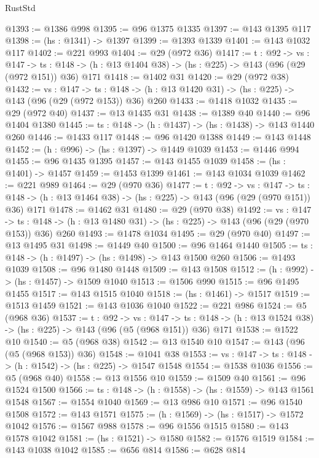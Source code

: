 \begin{lexlean}{RustStd}
\begin{coremodule}
{\begin{coremodule}
{{{{{@1393 := @1386 @998
@1395 := @96 @1375 @1335
@1397 := @143 @1395 @117
@1398 := (hs : @1341) -> @1397
@1399 := @1393 @1339
@1401 := @143 @1032 @117
@1402 := @221 @993
@1404 := @29 (@972 @36)
@1417 := {t : @92} ->
  {vs : @147} ->
  {ts : @148} -> (h : @13 @1404 @38) -> (hs : @225) -> @143 (@96 (@29 (@972 @151)) @36) @171
@1418 := @1402 @31
@1420 := @29 (@972 @38)
@1432 := {vs : @147} ->
  {ts : @148} -> (h : @13 @1420 @31) -> (hs : @225) -> @143 (@96 (@29 (@972 @153)) @36) @260
@1433 := @1418 @1032
@1435 := @29 (@972 @40)
@1437 := @13 @1435 @31
@1438 := @1389 @40
@1440 := @96 @1404 @1380
@1445 := {ts : @148} -> (h : @1437) -> (hs : @1438) -> @143 @1440 @260
@1446 := @1433 @117
@1448 := @96 @1420 @1388
@1449 := @143 @1448
@1452 := (h : @996) -> (hs : @1397) -> @1449 @1039
@1453 := @1446 @994
@1455 := @96 @1435 @1395
@1457 := @143 @1455 @1039
@1458 := (hs : @1401) -> @1457
@1459 := @1453 @1399
@1461 := @143 @1034 @1039
@1462 := @221 @989
@1464 := @29 (@970 @36)
@1477 := {t : @92} ->
  {vs : @147} ->
  {ts : @148} -> (h : @13 @1464 @38) -> (hs : @225) -> @143 (@96 (@29 (@970 @151)) @36) @171
@1478 := @1462 @31
@1480 := @29 (@970 @38)
@1492 := {vs : @147} ->
  {ts : @148} -> (h : @13 @1480 @31) -> (hs : @225) -> @143 (@96 (@29 (@970 @153)) @36) @260
@1493 := @1478 @1034
@1495 := @29 (@970 @40)
@1497 := @13 @1495 @31
@1498 := @1449 @40
@1500 := @96 @1464 @1440
@1505 := {ts : @148} -> (h : @1497) -> (hs : @1498) -> @143 @1500 @260
@1506 := @1493 @1039
@1508 := @96 @1480 @1448
@1509 := @143 @1508
@1512 := (h : @992) -> (hs : @1457) -> @1509 @1040
@1513 := @1506 @990
@1515 := @96 @1495 @1455
@1517 := @143 @1515 @1040
@1518 := (hs : @1461) -> @1517
@1519 := @1513 @1459
@1521 := @143 @1036 @1040
@1522 := @221 @986
@1524 := @5 (@968 @36)
@1537 := {t : @92} ->
  {vs : @147} ->
  {ts : @148} -> (h : @13 @1524 @38) -> (hs : @225) -> @143 (@96 (@5 (@968 @151)) @36) @171
@1538 := @1522 @10
@1540 := @5 (@968 @38)
@1542 := @13 @1540 @10
@1547 := @143 (@96 (@5 (@968 @153)) @36)
@1548 := @1041 @38
@1553 := {vs : @147} -> {ts : @148} -> (h : @1542) -> (hs : @225) -> @1547 @1548
@1554 := @1538 @1036
@1556 := @5 (@968 @40)
@1558 := @13 @1556 @10
@1559 := @1509 @40
@1561 := @96 @1524 @1500
@1566 := {ts : @148} -> (h : @1558) -> (hs : @1559) -> @143 @1561 @1548
@1567 := @1554 @1040
@1569 := @13 @986 @10
@1571 := @96 @1540 @1508
@1572 := @143 @1571
@1575 := (h : @1569) -> (hs : @1517) -> @1572 @1042
@1576 := @1567 @988
@1578 := @96 @1556 @1515
@1580 := @143 @1578 @1042
@1581 := (hs : @1521) -> @1580
@1582 := @1576 @1519
@1584 := @143 @1038 @1042
@1585 := @656 @814
@1586 := @628 @814
}}}}}
\end{coremodule}}
\end{coremodule}
\end{lexlean}
